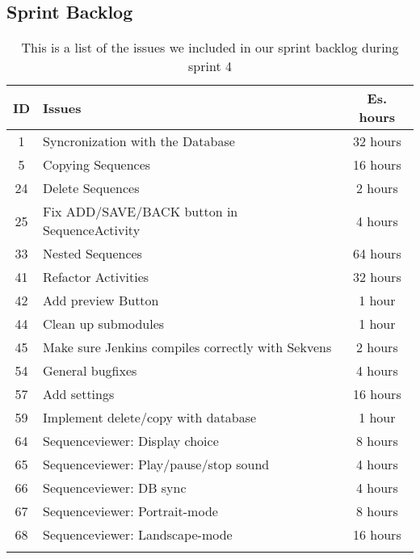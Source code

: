 \subsection{Sprint Backlog}\label{subsec:spr4_sprblog}
\begin{longtable} { | c | p{12cm} | c | } 
\hline
	ID 	&	Issues	&	Es. hours  \\\hline
	1	& 	Syncronization with the Database		&	32 hours  \\\hline
	5	& 	Copying Sequences		&	16 hours  \\\hline
	24	& 	Delete Sequences		&	2 hours  \\\hline
	25	& 	Fix ADD/SAVE/BACK button in SequenceActivity		&	4 hours  \\\hline
	33	& 	Nested Sequences		&	64 hours  \\\hline
	41	& 	Refactor Activities		&	32 hours  \\\hline
	42	&	Add preview Button		&	1 hour	  \\\hline
	44	&	Clean up submodules &	1 hour	\\\hline
	45	&	Make sure Jenkins compiles correctly with Sekvens	&	2 hours	\\\hline
	54	&	General bugfixes	&	4 hours \\\hline
	57  &	Add settings			&	16 hours	\\\hline	
	59  &	Implement delete/copy with database	&	1 hour \\\hline
	64	& 	Sequenceviewer: Display choice		&	8 hours  \\\hline
	65	& 	Sequenceviewer: Play/pause/stop sound		&	4 hours  \\\hline
	66	& 	Sequenceviewer: DB sync		&	4 hours  \\\hline
	67	& 	Sequenceviewer: Portrait-mode		&	8 hours  \\\hline
	68	& 	Sequenceviewer: Landscape-mode	&	16 hours  \\\hline
\caption{This is a list of the issues we included in our sprint backlog during sprint 4}
\label{tab:spr4_sprintblog}
\end{longtable}